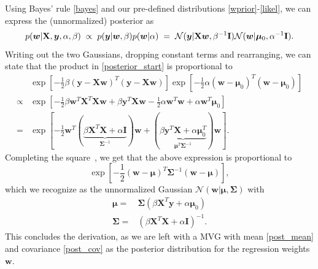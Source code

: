 \documentclass[english, 12pt, a4paper, sci, utf8, a-2b, online]{aaltothesis}
\begin{document}
Using Bayes' rule \eqref{bayes} and our pre-defined distributions \eqref{wprior}-\eqref{likel}, we can express the (unnormalized) posterior as
%
\begin{equation} \label{posterior_start}
  p(\bm{w}|\mathbf{X},\bm{y},\alpha,\beta)
  \hspace{1mm}\propto\hspace{1mm} p(\bm{y}|\bm{w},\beta)p(\bm{w}|\alpha)
  \hspace{1mm}=\hspace{1mm}\mathcal{N}(\bm{y}|\mathbf{X}\bm{w}, \beta^{-1}\mathbf{I})\mathcal{N}(\bm{w}|\bm{\mu}_0,\alpha^{-1}\mathbf{I}).
\end{equation}
%
Writing out the two Gaussians, dropping constant terms and rearranging, we can state that the product in \eqref{posterior_start} is proportional to
%
\begin{align*}
          & \exp\left[-\frac{1}{2}\beta (\bm{y}-\mathbf{X}\bm{w})^T(\bm{y}-\mathbf{X}\bm{w})\right] \exp\left[-\frac{1}{2}\alpha (\bm{w}-\bm{\mu}_0)^T(\bm{w}-\bm{\mu}_0)\right] \\
  \propto & \exp\left[-\frac{1}{2}\beta\bm{w}^T\mathbf{X}^T\mathbf{X}\bm{w} + \beta\bm{y}^T\mathbf{X}\bm{w}-\frac{1}{2}\alpha\bm{w}^T\bm{w} + \alpha\bm{w}^T\bm{\mu}_0\right]    \\
  =       & \exp\left[-\frac{1}{2}\bm{w}^T(\underbrace{\beta\mathbf{X}^T\mathbf{X}+\alpha\mathbf{I}}_{\mathbf{\Sigma}^{-1}})\bm{w}
    +(\underbrace{\beta\bm{y}^T\mathbf{X}+\alpha\bm{\mu}_0^T}_{\bm{\mu}^T\mathbf{\Sigma}^{-1}})\bm{w}\right].
\end{align*}
%
Completing the square~\cite{barber}, we get that the above expression is proportional to
%
\begin{equation*}
  \exp\left[-\frac{1}{2}(\bm{w}-\bm{\mu})^T\mathbf{\Sigma}^{-1}(\bm{w}-\bm{\mu})\right],
\end{equation*}
%
which we recognize as the unnormalized Gaussian $\mathcal{N}(\bm{w}|\bm{\mu},\mathbf{\Sigma})$ with
%
\begin{align}
  \bm{\mu} =        & \mathbf{\Sigma}(\beta\mathbf{X}^T\bm{y}+\alpha\bm{\mu}_0) \label{post_mean} \\
  \mathbf{\Sigma} = & (\beta\mathbf{X}^T\mathbf{X}+\alpha\mathbf{I})^{-1} \label{post_cov}.
\end{align}
%
This concludes the derivation, as we are left with a MVG with mean \eqref{post_mean} and covariance \eqref{post_cov} as the posterior distribution for the regression weights $\bm{w}$.
\end{document}
